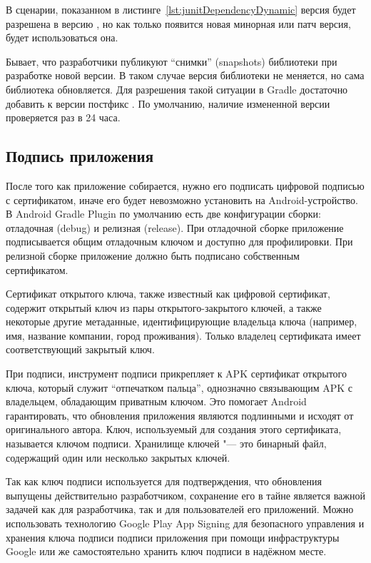 В сценарии, показанном в листинге~\ref{lst:junitDependencyDynamic} версия  будет разрешена в версию , но как только появится новая минорная или патч версия, будет использоваться она.

Бывает, что разработчики публикуют ``снимки'' (snapshots) библиотеки при разработке новой версии.
В таком случае версия библиотеки не меняется, но сама библиотека обновляется.
Для разрешения такой ситуации в Gradle достаточно добавить к версии постфикс .
По умолчанию, наличие измененной версии проверяется раз в 24 часа.

\subsection{Подпись приложения}
\label{subsec:signing}

После того как приложение собирается, нужно его подписать цифровой подписью с сертификатом, иначе его будет невозможно установить на Android-устройство.
В Android Gradle Plugin по умолчанию есть две конфигурации сборки: отладочная (debug) и релизная (release).
При отладочной сборке приложение подписывается общим отладочным ключом и доступно для профилировки.
При релизной сборке приложение должно быть подписано собственным сертификатом.

Сертификат открытого ключа, также известный как цифровой сертификат, содержит открытый ключ из пары открытого-закрытого ключей, а также некоторые другие метаданные, идентифицирующие владельца ключа (например, имя, название компании, город проживания).
Только владелец сертификата имеет соответствующий закрытый ключ.

При подписи, инструмент подписи прикрепляет к APK сертификат открытого ключа, который служит ``отпечатком пальца'', однозначно связывающим APK с владельцем, обладающим приватным ключом.
Это помогает Android гарантировать, что обновления приложения являются подлинными и исходят от оригинального автора.
Ключ, используемый для создания этого сертификата, называется ключом подписи.
Хранилище ключей "--- это бинарный файл, содержащий один или несколько закрытых ключей.

Так как ключ подписи используется для подтверждения, что обновления выпущены действительно разработчиком, сохранение его в тайне является важной задачей как для разработчика, так и для пользователей его приложений.
Можно использовать технологию Google Play App Signing для безопасного управления и хранения ключа подписи подписи приложения при помощи инфраструктуры Google или же самостоятельно хранить ключ подписи в надёжном месте.

